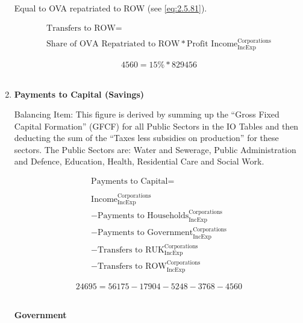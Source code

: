 \begin{enumerate}
Equal to OVA repatriated to ROW (see \ref{eq:2.5.81}). \cite{ScotGov2012}

\begin{equation}
\begin{split}
\text{Transfers to ROW} =  \\ \\
\text{Share of OVA Repatriated to ROW}*\text{Profit Income}^\text{Corporations}_\text{IncExp}
\end{split} \label{eq:2.5.32}
\end{equation}

\begin{equation} \nonumber
4560 = 15\%*829456
\end{equation}\\


\item \textbf {Payments to Capital (Savings)}

Balancing Item: This figure is derived by summing up the ``Gross Fixed Capital Formation'' (GFCF) for all Public Sectors in the IO Tables and then deducting the sum of the ``Taxes less subsidies on production'' for these sectors. The Public Sectors are: Water and Sewerage, Public Administration and Defence, Education, Health, Residential Care and Social Work. \cite{ScotGov2013a}

\begin{equation}
\begin{split}
\text{Payments to Capital} =  \\ \\
\text{Income}^\text{Corporations}_\text{IncExp}\\
-\text{Payments to Households}^\text{Corporations}_\text{IncExp}\\
-\text{Payments to Government}^\text{Corporations}_\text{IncExp}\\
-\text{Transfers to RUK}^\text{Corporations}_\text{IncExp}\\
-\text{Transfers to ROW}^\text{Corporations}_\text{IncExp}
\end{split} \label{eq:2.5.33}
\end{equation}

\begin{equation} \nonumber
24695 = 56175-17904-5248-3768-4560
\end{equation}\\


\pagebreak

\begin{center}
\textbf{\LARGE Government}
\end{center}


\end{enumerate}

